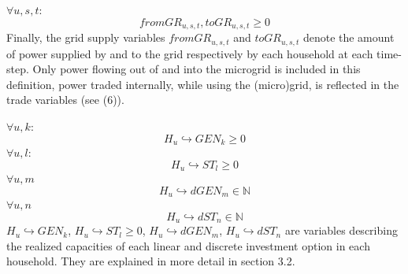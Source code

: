 \documentclass[
	11pt,								%
	DIV10,								%
	a4paper,         					%
	oneside,							%
	headheight=20pt,					%
	footheight=20pt,					%
    parskip=full,						%
    listof=totoc,						%
	bibliography=totoc,					%
	index=totoc,						%
]{scrartcl}
\begin{document}
	\\\\
	$\forall u,s,t$:
	\begin{equation}
		fromGR_{u,s,t}, toGR_{u,s,t} \geq 0
	\end{equation}
	Finally, the grid supply variables $fromGR_{u,s,t}$ and $toGR_{u,s,t}$ denote the amount of power supplied by and to the grid respectively by each household at each time-step. Only power flowing out of and into the microgrid is included in this definition, power traded internally, while using the (micro)grid, is reflected in the trade variables (see (6)).
	
	$\forall u,k$:
	\begin{equation}
		H_u\hookrightarrow GEN_k \geq 0
	\end{equation}
	$\forall u,l$:
	\begin{equation}
		H_u\hookrightarrow  ST_l \geq 0
	\end{equation}
	$\forall u,m$
	\begin{equation}
		H_u\hookrightarrow d GEN_m \in \mathbb{N}
	\end{equation}
	$\forall u,n$
	\begin{equation}
		H_u\hookrightarrow d ST_n \in \mathbb{N}
	\end{equation}
	$H_u\hookrightarrow GEN_k$, $H_u\hookrightarrow  ST_l \geq 0$, $H_u\hookrightarrow d GEN_m$, $H_u\hookrightarrow d ST_n$ are variables describing the realized capacities of each linear and discrete investment option in each household. They are explained in more detail in section 3.2.
\end{document}
